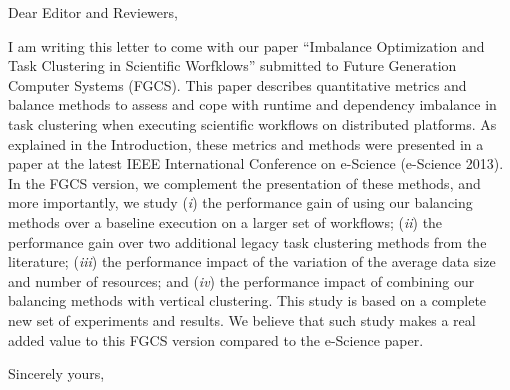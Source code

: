 \documentclass[a4]{letter}
\date{February 12th, 2014}
\begin{document}
\begin{letter}{}

\opening{Dear Editor and Reviewers,}

I am writing this letter to come with our paper ``Imbalance Optimization and Task Clustering in Scientific Worfklows'' submitted to Future Generation Computer Systems (FGCS). This paper describes quantitative metrics and balance methods to assess and cope with runtime and dependency imbalance in task clustering when executing scientific workflows on distributed platforms. As explained in the Introduction, these metrics and methods were presented in a paper at the latest IEEE International Conference on e-Science (e-Science 2013). In the FGCS version, we complement the presentation of these methods, and more importantly, we study (\emph{i}) the performance gain of using our balancing methods over a baseline execution on a larger set of workflows; (\emph{ii}) the performance gain over two additional legacy task clustering methods from the literature; (\emph{iii}) the performance impact of the variation of the average data size and number of resources; and (\emph{iv}) the performance impact of combining our balancing methods with vertical clustering. This study is based on a complete new set of experiments and results. We believe that such study makes a real added value to this FGCS version compared to the e-Science paper.

\closing{Sincerely yours,}



\end{letter}
\end{document}
